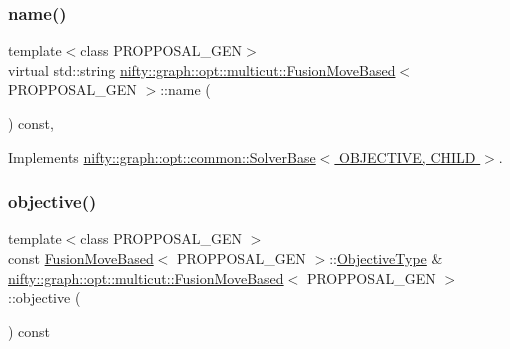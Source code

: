 \subsubsection{\texorpdfstring{name()}{name()}}
{\footnotesize\ttfamily template$<$class P\+R\+O\+P\+P\+O\+S\+A\+L\+\_\+\+G\+EN$>$ \\
virtual std\+::string \hyperlink{classnifty_1_1graph_1_1opt_1_1multicut_1_1FusionMoveBased}{nifty\+::graph\+::opt\+::multicut\+::\+Fusion\+Move\+Based}$<$ P\+R\+O\+P\+P\+O\+S\+A\+L\+\_\+\+G\+EN $>$\+::name (\begin{DoxyParamCaption}{ }\end{DoxyParamCaption}) const\hspace{0.3cm}{\ttfamily [inline]}, {\ttfamily [virtual]}}



Implements \hyperlink{classnifty_1_1graph_1_1opt_1_1common_1_1SolverBase_af638b9a804cfec3e35fe87c77e942d30}{nifty\+::graph\+::opt\+::common\+::\+Solver\+Base$<$ O\+B\+J\+E\+C\+T\+I\+V\+E, C\+H\+I\+L\+D $>$}.

\mbox{\label{classnifty_1_1graph_1_1opt_1_1multicut_1_1FusionMoveBased_a4feaafa03aaeab42931ee2a5b40b0307}} 
\subsubsection{\texorpdfstring{objective()}{objective()}}
{\footnotesize\ttfamily template$<$class P\+R\+O\+P\+P\+O\+S\+A\+L\+\_\+\+G\+EN $>$ \\
const \hyperlink{classnifty_1_1graph_1_1opt_1_1multicut_1_1FusionMoveBased}{Fusion\+Move\+Based}$<$ P\+R\+O\+P\+P\+O\+S\+A\+L\+\_\+\+G\+EN $>$\+::\hyperlink{classnifty_1_1graph_1_1opt_1_1multicut_1_1FusionMoveBased_ac860a461dd2c12fd2e67553a4457ee58}{Objective\+Type} \& \hyperlink{classnifty_1_1graph_1_1opt_1_1multicut_1_1FusionMoveBased}{nifty\+::graph\+::opt\+::multicut\+::\+Fusion\+Move\+Based}$<$ P\+R\+O\+P\+P\+O\+S\+A\+L\+\_\+\+G\+EN $>$\+::objective (\begin{DoxyParamCaption}{ }\end{DoxyParamCaption}) const\hspace{0.3cm}{\ttfamily [virtual]}}




